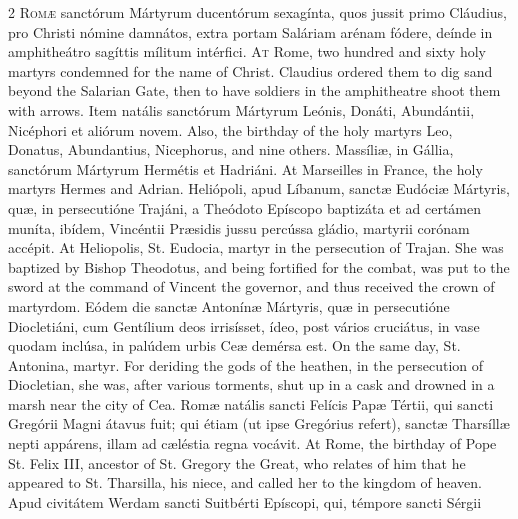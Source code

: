 \begin{paracol}{2}
\lettrine[lines=2]{R}{omæ} sanctórum Mártyrum ducentórum sexagínta, 
 quos jussit primo Cláudius, pro Christi nómine damnátos, extra portam 
 Saláriam arénam fódere, deínde in amphitheátro sagíttis mílitum intérfici.
\switchcolumn
{}
\lettrine[lines=2]{A}{t} Rome, two hundred and sixty holy martyrs condemned for the name of 
 Christ. Claudius ordered them to dig sand beyond the Salarian Gate, 
 then to have soldiers in the amphitheatre shoot them with arrows.
\switchcolumn*
{}
Item natális sanctórum Mártyrum Leónis, Donáti, Abundántii, Nicéphori 
 et aliórum novem.
\switchcolumn
{}
Also, the birthday of the holy martyrs Leo, Donatus, Abundantius, Nicephorus, 
 and nine others.
\switchcolumn*
{}
Massíliæ, in Gállia, sanctórum Mártyrum 
 Hermétis et Hadriáni.
\switchcolumn
{}
At Marseilles in France, the holy martyrs Hermes and Adrian.
\switchcolumn*
{}
Heliópoli, apud Líbanum, sanctæ Eudóciæ 
 Mártyris, quæ, in persecutióne Trajáni, a Theódoto Epíscopo baptizáta et ad 
 certámen muníta, ibídem, Vincéntii Præsidis jussu percússa gládio, martyrii 
 corónam accépit.
\switchcolumn
{}
At Heliopolis, St. Eudocia, martyr in the persecution of Trajan. She 
 was baptized by Bishop Theodotus, and being fortified for the combat, was 
 put to the sword at the command of Vincent the governor, and thus received 
 the crown of martyrdom.
\switchcolumn*
{}
Eódem die sanctæ Antonínæ Mártyris, quæ in 
 persecutióne Diocletiáni, cum Gentílium deos irrisísset, ídeo, post vários 
 cruciátus, in vase quodam inclúsa, in palúdem urbis Ceæ demérsa est.
\switchcolumn
{}
On the same day, St. Antonina, martyr. For deriding the gods of the 
 heathen, in the persecution of Diocletian, she was, after various torments, 
 shut up in a cask and drowned in a marsh near the city of Cea.
\switchcolumn*
{}
Romæ natális sancti Felícis Papæ Tértii, qui 
 sancti Gregórii Magni átavus fuit; qui étiam (ut ipse Gregórius refert), 
 sanctæ Tharsíllæ nepti appárens, illam ad cæléstia regna vocávit.
\switchcolumn
{}
At Rome, the birthday of Pope St. Felix III, ancestor of St. Gregory the 
 Great, who relates of him that he appeared to St. Tharsilla, his niece, and 
 called her to the kingdom of heaven.
\switchcolumn*
{}
Apud civitátem Werdam sancti Suitbérti Epíscopi, qui, témpore sancti Sérgii 

\end{paracol}
